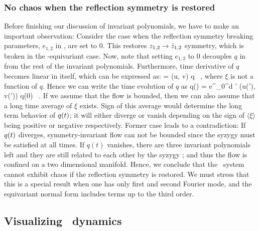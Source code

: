 \subsubsection{No chaos when the reflection symmetry is restored}
\label{s:dfsafs}

Before finishing our discussion of invariant polynomials, we have to make an
important observation: Consider the case when the reflection symmetry breaking
parameters, $e_{1,2}$ in , are set to $0$. This restores
$z_{1,2} \rightarrow \bar{z}_{1,2}$ symmetry, which is broken in
the -equivariant case. Now, note that setting $ e_{1,2} $ to $0$
decouples $q$ in  from the rest of the invariant polynomials.
Furthermore, time derivative of $q$ becomes linear in itself, which can be
expressed as:
\beq
     = \xi (u, v) q \, ,
where $\xi$ is not a function of $q$. Hence we can write
the time evolution of $q$ as
\beq
    q(\zeit) =  e^{\int_0^\zeit d \zeit' \xi (u(\zeit'), v(\zeit'))} q(0) \, .
If we assume that the flow is bounded, then we can also assume that a long time
average of $\xi$ exists. Sign of this average would determine the long term
behavior of $q(t)$; it will either diverge or vanish depending on the sign of
$\langle \xi \rangle$ being positive or negative respectively. Former case
leads to a contradiction: If $q(t)$ diverges, symmetry-invariant flow can not
be bounded since the syzygy  must be satisfied at all times. If
$q(t)$ vanishes, there are three invariant polynomials left and they are still
related to each other by the syzygy ; and thus the flow is confined
on a two dimensional manifold. Hence, we conclude that the \twomode\ system
 cannot exhibit chaos if the reflection symmetry is restored.
We must stress that this is a special result when one has only first and second
Fourier mode, and the equivariant normal form includes terms up to the third order.

\subsection{Visualizing \twomode\ dynamics}
\label{s:visual}

